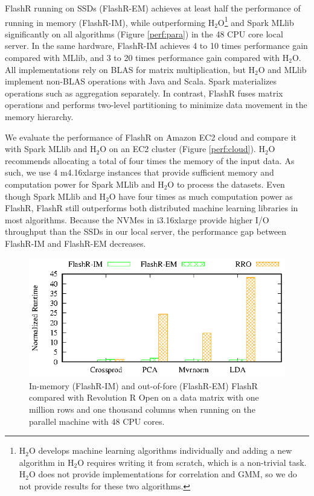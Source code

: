 FlashR running on SSDs (FlashR-EM) achieves at least half the performance of
running in memory (FlashR-IM), while outperforming H$_2$O\footnote{
H$_2$O develops machine learning algorithms individually and adding
a new algorithm in H$_2$O requires writing it from scratch, which is
a non-trivial task. H$_2$O does not provide implementations for correlation
and GMM, so we do not provide results for these two algorithms.}
and Spark MLlib significantly on all algorithms
(Figure \ref{perf:para}) in the 48 CPU core local server.
In the same hardware, FlashR-IM achieves 4 to 10 times
performance gain compared
with MLlib, and 3 to 20 times performance gain compared with H$_2$O.
All implementations rely on BLAS for matrix multiplication, but H$_2$O
and MLlib implement non-BLAS operations with Java and Scala.
Spark materializes operations such as aggregation separately. In contrast,
FlashR fuses matrix operations and performs two-level partitioning to
minimize data movement in the memory hierarchy.

We evaluate the performance of FlashR on Amazon EC2 cloud and compare it
with Spark MLlib and H$_2$O on an EC2 cluster (Figure \ref{perf:cloud}). H$_2$O
recommends
allocating a total of four times the memory of the input data. As such, we use
4 m4.16xlarge instances that provide sufficient memory and computation power for
Spark MLlib and H$_2$O to process the datasets.
Even though Spark MLlib and H$_2$O have four times as much computation power as FlashR,
FlashR still outperforms both distributed machine learning libraries in most algorithms.
Because the NVMes in i3.16xlarge provide higher I/O throughput than the SSDs
in our local server, the performance gap between FlashR-IM and FlashR-EM decreases.

\begin{figure}
  \vspace{-10pt}
	\begin{center}
		\footnotesize
		\includegraphics{FlashMatrix_figs/FlashR-vs-RRO.eps}
		\vspace{-10pt}
		\caption{In-memory (FlashR-IM) and out-of-fore (FlashR-EM) FlashR
		compared with Revolution R Open on a data matrix with one million rows
		and one thousand columns when running on the parallel machine with
		48 CPU cores.}
		\label{fig:fmR}
	\end{center}
  \vspace{-15pt}
\end{figure}

